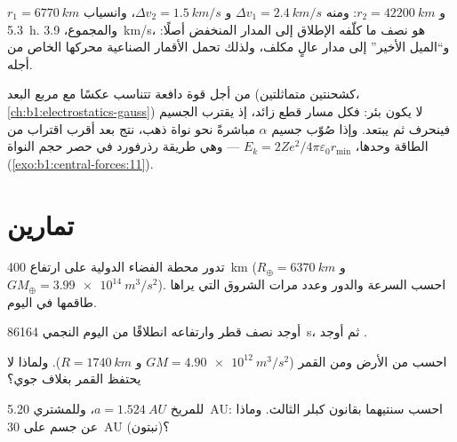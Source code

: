 \begin{example}\label{ex:b1:central-forces:leogeo}
$r_1 = \qty{6770}{km}$ و $r_2 = \qty{42200}{km}$: ومنه $\Delta v_1 = \qty{2.4}{km/s}$
و $\Delta v_2 = \qty{1.5}{km/s}$، وانسياب \qty{5.3}{h}. والمجموع،
\qty{3.9}{km/s}، هو نصف ما كلّفه الإطلاق إلى المدار المنخفض أصلًا:
و``الميل الأخير'' إلى مدار عالٍ مكلف، ولذلك تحمل الأقمار الصناعية محركها
الخاص من أجله.
\end{example}

\begin{remark}\label{rem:b1:central-forces:rutherford}
من أجل قوة دافعة تتناسب عكسًا مع مربع البعد (كشحنتين متماثلتين،
\cref{ch:b1:electrostatics-gauss}) لا يكون  بئر:
فكل مسار قطع زائد، إذ يقترب الجسيم فينحرف
ثم يبتعد. وإذا صُوّب جسيم $\alpha$ مباشرةً نحو نواة ذهب، نتج
بعد أقرب اقتراب من الطاقة وحدها، $E_k =
2Ze^2/4\pi\varepsilon_0 r_{\min}$ --- وهي طريقة رذرفورد في حصر حجم
النواة (\cref{exo:b1:central-forces:11}).
\end{remark}

\section{تمارين}

\begin{exercise}[$\star$]\label{exo:b1:central-forces:1}
تدور محطة الفضاء الدولية على ارتفاع \qty{400}{km}
($R_\oplus = \qty{6370}{km}$ و $GM_\oplus = \qty{3.99e14}{m^3/s^2}$). احسب السرعة
والدور وعدد مرات الشروق التي يراها طاقمها في اليوم.
\end{exercise}

\begin{exercise}[$\star$]\label{exo:b1:central-forces:2}
أوجد نصف قطر  وارتفاعه انطلاقًا من
اليوم النجمي \qty{86164}{s}، ثم أوجد .
\end{exercise}

\begin{exercise}[$\star$]\label{exo:b1:central-forces:3}
احسب  من الأرض ومن القمر ($GM = \qty{4.90e12}{m^3/s^2}$ و
$R = \qty{1740}{km}$). ولماذا لا يحتفظ القمر بغلاف جوي؟
\end{exercise}

\begin{exercise}[$\star$]\label{exo:b1:central-forces:4}
للمريخ $a = \qty{1.524}{AU}$، وللمشتري \qty{5.20}{AU}: احسب سنتيهما بقانون
كبلر الثالث. وماذا عن جسم على \qty{30}{AU} (نبتون)؟
\end{exercise}

